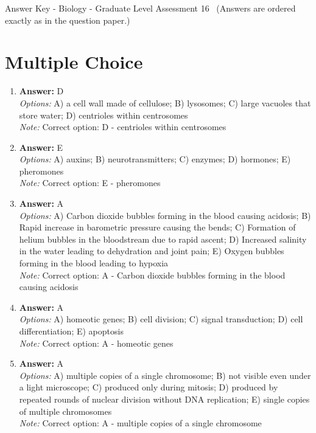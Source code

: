 \documentclass[12pt]{article}
\begin{document}
\begin{center}
Answer Key - Biology - Graduate Level Assessment 16 \
\small (Answers are ordered exactly as in the question paper.)
\end{center}

\section*{Multiple Choice}
\begin{enumerate}[label=\arabic*.]
\item \textbf{Answer:} D
\\ \textit{Options:} A) a cell wall made of cellulose; B) lysosomes; C) large vacuoles that store water; D) centrioles within centrosomes
\\ \textit{Note:} Correct option: D - centrioles within centrosomes
\item \textbf{Answer:} E
\\ \textit{Options:} A) auxins; B) neurotransmitters; C) enzymes; D) hormones; E) pheromones
\\ \textit{Note:} Correct option: E - pheromones
\item \textbf{Answer:} A
\\ \textit{Options:} A) Carbon dioxide bubbles forming in the blood causing acidosis; B) Rapid increase in barometric pressure causing the bends; C) Formation of helium bubbles in the bloodstream due to rapid ascent; D) Increased salinity in the water leading to dehydration and joint pain; E) Oxygen bubbles forming in the blood leading to hypoxia
\\ \textit{Note:} Correct option: A - Carbon dioxide bubbles forming in the blood causing acidosis
\item \textbf{Answer:} A
\\ \textit{Options:} A) homeotic genes; B) cell division; C) signal transduction; D) cell differentiation; E) apoptosis
\\ \textit{Note:} Correct option: A - homeotic genes
\item \textbf{Answer:} A
\\ \textit{Options:} A) multiple copies of a single chromosome; B) not visible even under a light microscope; C) produced only during mitosis; D) produced by repeated rounds of nuclear division without DNA replication; E) single copies of multiple chromosomes
\\ \textit{Note:} Correct option: A - multiple copies of a single chromosome
\end{enumerate}
\end{document}
